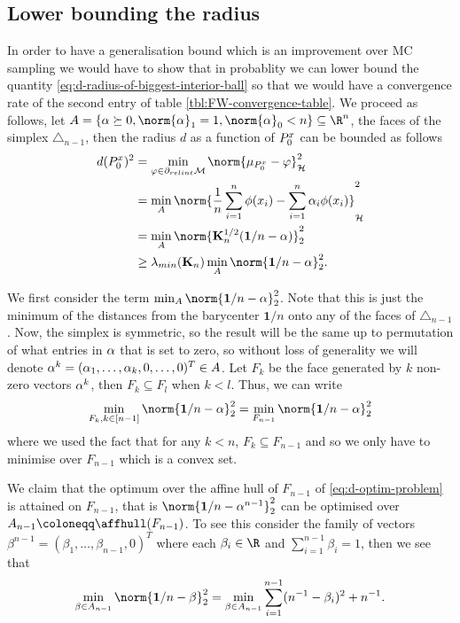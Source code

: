 \subsection{Lower bounding the radius}
In order to have a generalisation bound which is an improvement over MC sampling
we would have to show that in probablity we can lower bound the quantity
\ref{eq:d-radius-of-biggest-interior-ball} so that we would have a convergence
rate of the second entry of table \ref{tbl:FW-convergence-table}. We proceed as
follows, let \(A = \{\mat{\alpha} \succeq 0, \norm{\mat{\alpha}}_1 = 1,
\norm{\mat{\alpha}}_0 < n\} \subseteq \R^{n}\), the faces of the simplex \(\triangle_{n-1}\),
then the radius \(d\) as a function of \(P^x_{0}\) can be bounded as follows
\begin{align*}
  d(\poolsetx_0)^2 & = \min_{\varphi \in \partial_{relint} \mathcal{M}}\norm{\mu_{\poolsetx_0} - \varphi}^2_{\rkhs{H}} \\
                   & = \min_{A}\norm{\frac{1}{n}\sum_{i=1}^n\phi(x_i) - \sum_{i=1}^n \alpha_{i} \phi(x_{i})}^2_{\rkhs{H}} \\
                   & = \min_{A} \norm{\mat{K}_n^{1/2}(\mathbf{1}/n - \mat{\alpha})}_{2}^2 \\
                   & \geq \lambda_{min}(\mat{K}_{n}) \min_{A} \norm{\mathbf{1}/n - \mat{\alpha}}_{2}^2.
\end{align*}

We first consider the term \(\min_{A} \norm{\mathbf{1}/n -
  \mat{\alpha}}_{2}^2\). Note that this is just the minimum of the distances from
the barycenter \(\mathbf{1}/n\) onto any of the faces of \(\triangle_{n-1}\).
Now, the simplex is symmetric, so the result will be the same up to permutation
of what entries in \(\mathbf{\alpha}\) that is set to zero, so without loss of
generality we will denote \(\mathbf{\alpha}^{k} = (\alpha_{1}, \dots, \alpha_{k},
0, \dots, 0)^{T} \in A\). Let \(F_{k}\) be the face generated by \(k\)
non-zero vectors \(\mathbf{\alpha}^{k}\), then \(F_{k} \subseteq F_{l}\) when \(k
< l\). Thus, we can write
\begin{equation}
  \label{eq:d-optim-problem}
  \min_{F_{k}, k \in [n-1]} \norm{\mathbf{1}/n - \mat{\alpha}}_{2}^2 = \min_{F_{n-1}}\norm{\mathbf{1}/n - \mat{\alpha}}_{2}^2
\end{equation}
where we used the fact that for any \(k < n\), \(F_{k} \subseteq F_{n-1}\) and
so we only have to minimise over \(F_{n-1}\) which is a convex set.

We claim that the optimum over the affine hull of \(F_{n-1}\) of
\ref{eq:d-optim-problem} is attained on \(F_{n-1}\), that is
\(\norm{\mathbf{1}/n - \alpha^{n-1}}_{2}^{2}\) can be optimised over \(A_{n-1}
\coloneqq \affhull(F_{n-1})\). To see this consider the family of vectors
\(\beta^{n-1} = (\beta_{1}, \dots, \beta_{n-1}, 0)^{T}\) where each \(\beta_{i}
\in \R\) and \(\sum_{i=1}^{n-1}\beta_{i} = 1\), then we see that
\begin{equation}
  \label{eq:minimal-d-affhull-opt-problem}
  \min_{\mat{\beta} \in A_{n-1}}\norm{\mathbf{1}/n - \mat{\beta}}^{2}_{2} = \min_{\mat{\beta} \in A_{n-1}} \sum_{i=1}^{n-1} (n^{-1} - \beta_{i})^{2} + n^{-1}.
\end{equation}

